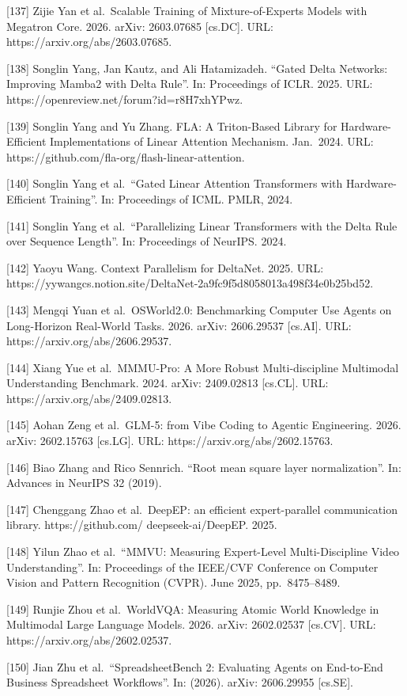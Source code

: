 {[}137{]} Zijie Yan et al.~Scalable Training of Mixture-of-Experts
Models with Megatron Core. 2026. arXiv: 2603.07685 {[}cs.DC{]}. URL:
https://arxiv.org/abs/2603.07685.

{[}138{]} Songlin Yang, Jan Kautz, and Ali Hatamizadeh. ``Gated Delta
Networks: Improving Mamba2 with Delta Rule''. In: Proceedings of ICLR.
2025. URL: https://openreview.net/forum?id=r8H7xhYPwz.

{[}139{]} Songlin Yang and Yu Zhang. FLA: A Triton-Based Library for
Hardware-Efficient Implementations of Linear Attention Mechanism.
Jan.~2024. URL: https://github.com/fla-org/flash-linear-attention.

{[}140{]} Songlin Yang et al.~``Gated Linear Attention Transformers with
Hardware-Efficient Training''. In: Proceedings of ICML. PMLR, 2024.

{[}141{]} Songlin Yang et al.~``Parallelizing Linear Transformers with
the Delta Rule over Sequence Length''. In: Proceedings of NeurIPS. 2024.

{[}142{]} Yaoyu Wang. Context Parallelism for DeltaNet. 2025. URL:
https://yywangcs.notion.site/DeltaNet-2a9fc9f5d8058013a498f34e0b25bd52.

{[}143{]} Mengqi Yuan et al.~OSWorld2.0: Benchmarking Computer Use
Agents on Long-Horizon Real-World Tasks. 2026. arXiv: 2606.29537
{[}cs.AI{]}. URL: https://arxiv.org/abs/2606.29537.

{[}144{]} Xiang Yue et al.~MMMU-Pro: A More Robust Multi-discipline
Multimodal Understanding Benchmark. 2024. arXiv: 2409.02813 {[}cs.CL{]}.
URL: https://arxiv.org/abs/2409.02813.

{[}145{]} Aohan Zeng et al.~GLM-5: from Vibe Coding to Agentic
Engineering. 2026. arXiv: 2602.15763 {[}cs.LG{]}. URL:
https://arxiv.org/abs/2602.15763.

{[}146{]} Biao Zhang and Rico Sennrich. ``Root mean square layer
normalization''. In: Advances in NeurIPS 32 (2019).

{[}147{]} Chenggang Zhao et al.~DeepEP: an efficient expert-parallel
communication library. https://github.com/ deepseek-ai/DeepEP. 2025.

{[}148{]} Yilun Zhao et al.~``MMVU: Measuring Expert-Level
Multi-Discipline Video Understanding''. In: Proceedings of the IEEE/CVF
Conference on Computer Vision and Pattern Recognition (CVPR). June 2025,
pp.~8475--8489.

{[}149{]} Runjie Zhou et al.~WorldVQA: Measuring Atomic World Knowledge
in Multimodal Large Language Models. 2026. arXiv: 2602.02537
{[}cs.CV{]}. URL: https://arxiv.org/abs/2602.02537.

{[}150{]} Jian Zhu et al.~``SpreadsheetBench 2: Evaluating Agents on
End-to-End Business Spreadsheet Workflows''. In: (2026). arXiv:
2606.29955 {[}cs.SE{]}.

